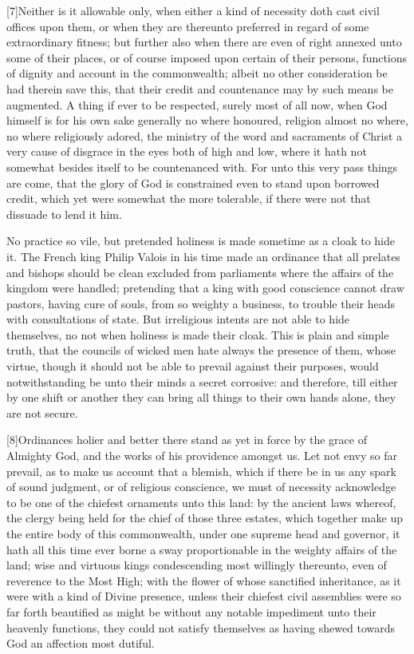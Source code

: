 [7]Neither is it allowable only, when either a kind of necessity doth cast civil offices upon them, or when they are thereunto preferred in regard of some extraordinary fitness; but further also when there are even of right annexed unto some of their places, or of course imposed upon certain of their persons, functions of dignity and account in the commonwealth; albeit no other consideration be had therein save this, that their credit and countenance may by such means be augmented. A thing if ever to be respected, surely most of all now, when God himself is for his own sake generally no where honoured, religion almost no where, no where religiously  adored, the ministry of the word and sacraments of Christ a very cause of disgrace in the eyes both of high and low, where it hath not somewhat besides itself to be countenanced with. For unto this very pass things are come, that the glory of God is constrained even to stand upon borrowed credit, which yet were somewhat the more tolerable, if there were not that dissuade to lend it him.

No practice so vile, but pretended holiness is made sometime as a cloak to hide it. The French king Philip Valois in his time made an ordinance that all prelates and bishops should be clean excluded from parliaments where the affairs of the kingdom were handled; pretending that a king with good conscience cannot draw pastors, having cure of souls, from so weighty a business, to trouble their heads with consultations of state. But irreligious intents are not able to hide themselves, no not when holiness is made their cloak. This is plain and simple truth, that the councils of wicked men hate always the presence of them, whose virtue, though it should not be able to prevail against their purposes, would notwithstanding be unto their minds a secret corrosive:  and therefore, till either by one shift or another they can bring all things to their own hands alone, they are not secure.

[8]Ordinances holier and better there stand as yet in force by the grace of Almighty God, and the works of his providence amongst us. Let not envy so far prevail, as to make us account that a blemish, which if there be in us any spark of sound judgment, or of religious conscience, we must of necessity acknowledge to be one of the chiefest ornaments unto this land: by the ancient laws whereof, the clergy being held for the chief of those three estates, which together make up the entire body of this commonwealth, under one supreme head and governor, it hath all this time ever borne a sway proportionable in the weighty affairs of the land; wise and virtuous kings condescending most willingly thereunto, even of reverence to the Most High; with the flower of whose sanctified inheritance, as it were with a kind of Divine presence, unless their chiefest civil assemblies were so far forth beautified as might be without any notable impediment unto their heavenly functions, they could not satisfy themselves as having shewed towards God an affection most dutiful.

